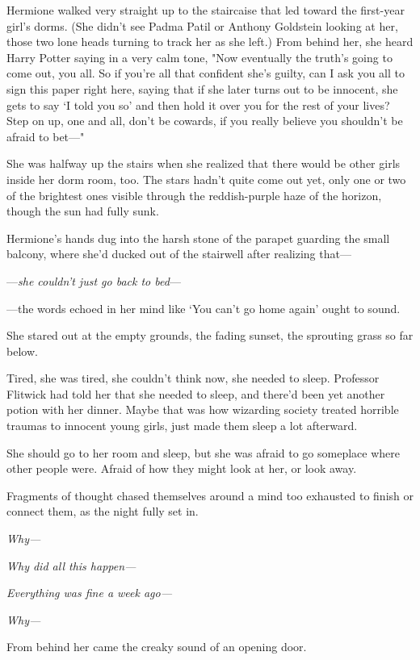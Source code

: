 Hermione walked very straight up to the staircaise that led toward the 
first-year girl's dorms. (She didn't see Padma Patil or Anthony Goldstein 
looking at her, those two lone heads turning to track her as she left.) From 
behind her, she heard Harry Potter saying in a very calm tone, "Now eventually 
the truth's going to come out, you all. So if you're all that confident she's 
guilty, can I ask you all to sign this paper right here, saying that if she 
later turns out to be innocent, she gets to say `I told you so' and then hold 
it over you for the rest of your lives? Step on up, one and all, don't be 
cowards, if you really believe you shouldn't be afraid to bet---"

She was halfway up the stairs when she realized that there would be other girls 
inside her dorm room, too.
\sbreak
The stars hadn't quite come out yet, only one or two of the brightest ones 
visible through the reddish-purple haze of the horizon, though the sun had 
fully sunk.

Hermione's hands dug into the harsh stone of the parapet guarding the small 
balcony, where she'd ducked out of the stairwell after realizing that---

---\emph{she couldn't just go back to bed}---

---the words echoed in her mind like `You can't go home again' ought to sound.

She stared out at the empty grounds, the fading sunset, the sprouting grass so 
far below.

Tired, she was tired, she couldn't think now, she needed to sleep. Professor 
Flitwick had told her that she needed to sleep, and there'd been yet another 
potion with her dinner. Maybe that was how wizarding society treated horrible 
traumas to innocent young girls, just made them sleep a lot afterward.

She should go to her room and sleep, but she was afraid to go someplace where 
other people were. Afraid of how they might look at her, or look away.

Fragments of thought chased themselves around a mind too exhausted to finish or 
connect them, as the night fully set in.

\emph{Why---}

\emph{Why did all this happen---}

\emph{Everything was fine a week ago---}

\emph{Why---}

From behind her came the creaky sound of an opening door.

